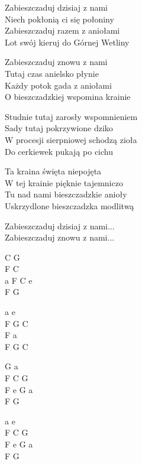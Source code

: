 \begin{text}
    Zabieszczaduj dzisiaj z nami\\
    Niech pokłonią ci się połoniny\\
    Zabieszczaduj razem z aniołami\\
    Lot swój kieruj do Górnej Wetliny

    Zabieszczaduj znowu z nami\\
    Tutaj czas anielsko płynie\\
    Każdy potok gada z aniołami\\
    O bieszczadzkiej wspomina krainie

    \vin Studnie tutaj zarosły wspomnieniem\\
    \vin Sady tutaj pokrzywione dziko\\
    \vin W procesji sierpniowej schodzą zioła\\
    \vin Do cerkiewek pukają po cichu

    \vin Ta kraina święta niepojęta\\
    \vin W tej krainie pięknie tajemniczo\\
    \vin Tu nad nami bieszczadzkie anioły\\
    \vin Uskrzydlone bieszczadzka modlitwą

    Zabieszczaduj dzisiaj z nami...\\
    Zabieszczaduj znowu z nami...
\end{text}
\begin{chord}
    C G\\
    F C\\
    a F C e\\
    F G

    a e\\
    F G C\\
    F a\\
    F G C

    \vin G a\\
    \vin F C G\\
    \vin F e G a\\
    \vin F G

    \vin a e\\
    \vin F C G\\
    \vin F e G a\\
    \vin F G

\end{chord}